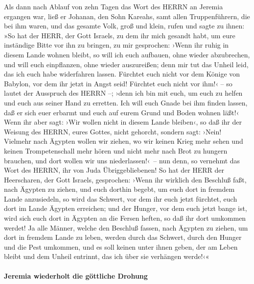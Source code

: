 Als dann nach Ablauf von zehn Tagen das Wort des HERRN an
Jeremia ergangen war, ließ er Johanan, den Sohn Kareahs,
samt allen Truppenführern, die bei ihm waren, und das gesamte Volk, groß
und klein, rufen und sagte zu ihnen: »So hat der HERR, der
Gott Israels, zu dem ihr mich gesandt habt, um eure inständige Bitte vor
ihn zu bringen, zu mir gesprochen: ›Wenn ihr ruhig in
diesem Lande wohnen bleibt, so will ich euch aufbauen, ohne wieder
abzubrechen, und will euch einpflanzen, ohne wieder auszureißen; denn
mir tut das Unheil leid, das ich euch habe widerfahren lassen.
Fürchtet euch nicht vor dem Könige von Babylon, vor dem
ihr jetzt in Angst seid! Fürchtet euch nicht vor ihm!‹ -- so lautet der
Ausspruch des HERRN --; ›denn ich bin mit euch, um euch zu helfen und
euch aus seiner Hand zu erretten. Ich will euch Gnade bei
ihm finden lassen, daß er sich euer erbarmt und euch auf eurem Grund und
Boden wohnen läßt!‹ Wenn ihr aber sagt: ›Wir wollen nicht
in diesem Lande bleiben‹, so daß ihr der Weisung des HERRN, eures
Gottes, nicht gehorcht, sondern sagt: ›Nein! Vielmehr
nach Ägypten wollen wir ziehen, wo wir keinen Krieg mehr sehen und
keinen Trompetenschall mehr hören und nicht mehr nach Brot zu hungern
brauchen, und dort wollen wir uns niederlassen!‹~-- nun
denn, so vernehmt das Wort des HERRN, ihr von Juda Übriggebliebenen! So
hat der HERR der Heerscharen, der Gott Israels, gesprochen: ›Wenn ihr
wirklich den Beschluß faßt, nach Ägypten zu ziehen, und euch dorthin
begebt, um euch dort in fremdem Lande anzusiedeln, so
wird das Schwert, vor dem ihr euch jetzt fürchtet, euch dort im Lande
Ägypten erreichen; und der Hunger, vor dem euch jetzt bange ist, wird
sich euch dort in Ägypten an die Fersen heften, so daß ihr dort umkommen
werdet! Ja alle Männer, welche den Beschluß fassen, nach
Ägypten zu ziehen, um dort in fremdem Lande zu leben, werden durch das
Schwert, durch den Hunger und die Pest umkommen, und es soll keinen
unter ihnen geben, der am Leben bleibt und dem Unheil entrinnt, das ich
über sie verhängen werde!‹«

\hypertarget{jeremia-wiederholt-die-guxf6ttliche-drohung}{%
\paragraph{Jeremia wiederholt die göttliche
Drohung}\label{jeremia-wiederholt-die-guxf6ttliche-drohung}}

